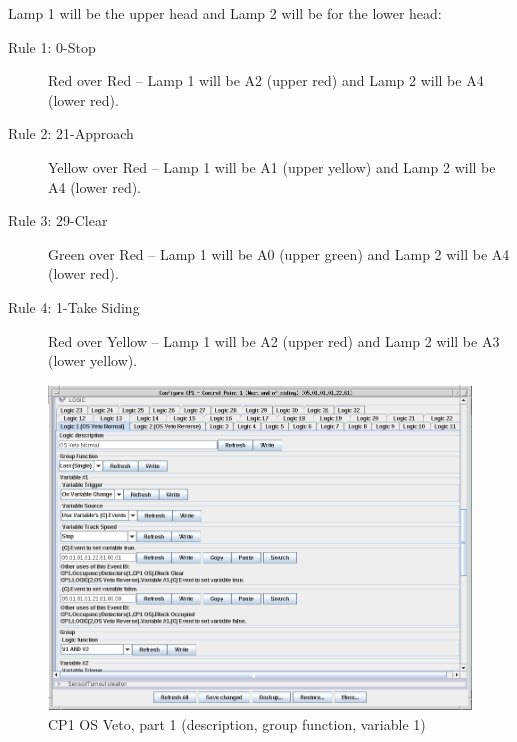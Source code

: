 Lamp 1 will be the upper head and Lamp 2 will be for the lower head:
\begin{description}
\item[Rule 1: 0-Stop] Red over Red -- Lamp 1 will be A2 (upper red) and Lamp 2 
will be A4 (lower red).
\item[Rule 2: 21-Approach] Yellow over Red -- Lamp 1 will be A1 (upper yellow) 
and Lamp 2 will be A4 (lower red).
\item[Rule 3: 29-Clear] Green over Red -- Lamp 1 will be A0 (upper green) and 
Lamp 2 will be A4 (lower red).
\item[Rule 4: 1-Take Siding] Red over Yellow -- Lamp 1 will be A2 (upper red) 
and Lamp 2 will be A3 (lower yellow).
\end{description}


\begin{figure}[hbpt]\begin{centering}%
\includegraphics[width=5in]{CP1-OSVeto-Normal1.png}
\caption{CP1 OS Veto, part 1 (description, group function, variable 1)}
\label{fig:CP1-OSVeto-Normal1}
\end{centering}\end{figure}                                                    
